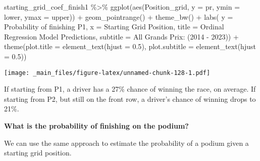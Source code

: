 \documentclass[
]{book}
\newenvironment{Shaded}{\begin{snugshade}}{\end{snugshade}}
\newcommand{\AttributeTok}[1]{\textcolor[rgb]{0.77,0.63,0.00}{#1}}
\newcommand{\FloatTok}[1]{\textcolor[rgb]{0.00,0.00,0.81}{#1}}
\newcommand{\FunctionTok}[1]{\textcolor[rgb]{0.00,0.00,0.00}{#1}}
\newcommand{\NormalTok}[1]{#1}
\newcommand{\SpecialCharTok}[1]{\textcolor[rgb]{0.00,0.00,0.00}{#1}}
\newcommand{\StringTok}[1]{\textcolor[rgb]{0.31,0.60,0.02}{#1}}
\begin{document}
\begin{Shaded}
\begin{Highlighting}[]
\NormalTok{starting\_grid\_coef\_finish1 }\SpecialCharTok{\%\textgreater{}\%}
  \FunctionTok{ggplot}\NormalTok{(}\FunctionTok{aes}\NormalTok{(Position\_grid, }\AttributeTok{y =}\NormalTok{ pr, }\AttributeTok{ymin =}\NormalTok{ lower, }\AttributeTok{ymax =}\NormalTok{ upper)) }\SpecialCharTok{+}
  \FunctionTok{geom\_pointrange}\NormalTok{() }\SpecialCharTok{+}
  \FunctionTok{theme\_bw}\NormalTok{() }\SpecialCharTok{+}
  \FunctionTok{labs}\NormalTok{( }\AttributeTok{y =} \StringTok{\textquotesingle{}Probability of finishing P1\textquotesingle{}}\NormalTok{,}
        \AttributeTok{x =} \StringTok{\textquotesingle{}Starting Grid Position\textquotesingle{}}\NormalTok{,}
       \AttributeTok{title =} \StringTok{\textquotesingle{}Ordinal Regression Model Predictions\textquotesingle{}}\NormalTok{,}
       \AttributeTok{subtitle =} \StringTok{\textquotesingle{}All Grands Prix: (2014 {-} 2023)\textquotesingle{}}\NormalTok{) }\SpecialCharTok{+}
  \FunctionTok{theme}\NormalTok{(}\AttributeTok{plot.title =} \FunctionTok{element\_text}\NormalTok{(}\AttributeTok{hjust =} \FloatTok{0.5}\NormalTok{),}
        \AttributeTok{plot.subtitle =} \FunctionTok{element\_text}\NormalTok{(}\AttributeTok{hjust =} \FloatTok{0.5}\NormalTok{))}
\end{Highlighting}
\end{Shaded}

\texttt{[image: \_main\_files/figure-latex/unnamed-chunk-128-1.pdf]}

If starting from P1, a driver has a 27\% chance of winning the race, on average. If starting from P2, but still on the front row, a driver's chance of winning drops to 21\%.

\textbf{What is the probability of finishing on the podium?}

We can use the same approach to estimate the probability of a podium given a starting grid position.
\end{document}
